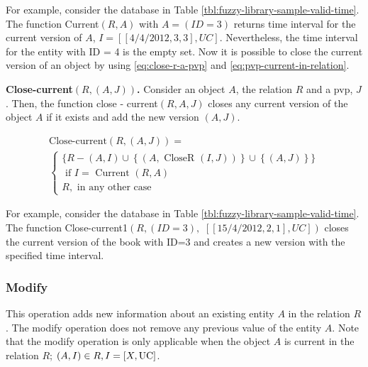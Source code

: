 For example, consider the database in Table \ref{tbl:fuzzy-library-sample-valid-time}. The function Current$\left(R, A \right)$ with $A =\left(ID=3\right)$ returns time interval for the current version of $A$, $I = \left[ \left[4/4/2012, 3, 3 \right], UC \right]$. Nevertheless, the time interval for the entity with ID = 4 is the empty set.
Now it is possible to close the current version of an object by using \eqref{eq:close-r-a-pvp} and \eqref{eq:pvp-current-in-relation}.

\begin{definition}
\label{def:pvp-close-current-version}
\textbf{Close-current$\left(R, \left(A, J \right) \right)$.}
Consider an object $A$, the relation $R$ and a pvp, $J$. Then, the function close - current$\left(R, A, J \right)$ closes any current version of the object $A$ if it exists and add the new version $\left(A, J \right)$.

\begin{eqnarray}
\label{eq:pvp-close-current}
\text{Close-current} \left(R, \left(A, J \right) \right) =\\
\begin{cases}
\nonumber
\big \lbrace R - \left(A, I \right) \cup \left \lbrace \left(A, \mbox{ CloseR } \left(I, J\right) \right) \right \rbrace \cup \left \lbrace \left(A, J\right)\right \rbrace  \big \rbrace \\
\nonumber
\mbox{ if } I = \mbox{ Current } \left(R, A \right) \\ %
\nonumber R , \text{ in any other case}
\end{cases}
\end{eqnarray}
\end{definition}

For example, consider the database in Table  \ref{tbl:fuzzy-library-sample-valid-time}. The function Close-current1$\left(R, \left(ID=3\right) \right.,$ $\left. \left[ \left[15/4/2012,2,1\right], UC\right]\right)$ closes the current version of the book with ID=3 and creates a new version with the specified time interval.

\subsubsection{\label{subsubsec:modify-fuzzy-temporal}Modify}
This operation adds new information about an existing entity $A$ in the relation $R$. The modify operation does not remove any previous value of the entity $A$.
Note that the modify operation is only applicable when the object $A$ is current in the relation $R$; $ \left(A, I \right) \in R, I = \left[X, \operatorname{UC} \right]$.

